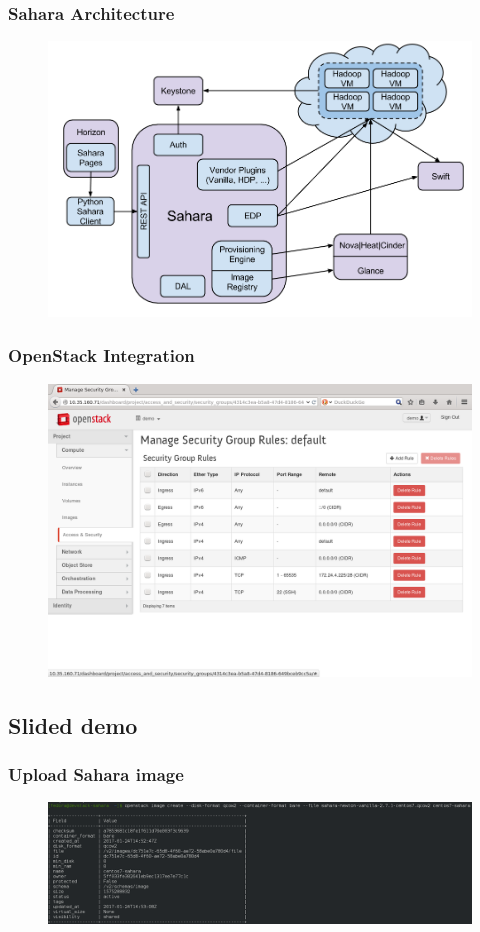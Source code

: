\begin{frame}
	\frametitle{Sahara Architecture}
	\begin{figure}
		\includegraphics[width=1\linewidth]{images/sahara-architecture.png}
	\end{figure}
\end{frame}

\begin{frame}
	\frametitle{OpenStack Integration}
	\begin{figure}
		\includegraphics[width=1\linewidth]{images/sahara-securitygroup.png}
	\end{figure}
\end{frame}


\subsection{Slided demo}
\begin{frame}
	\frametitle{Upload Sahara image}
	\begin{figure}
		\includegraphics[width=1\linewidth]{images/1-upload_sahara_image.png}
	\end{figure}
\end{frame}


